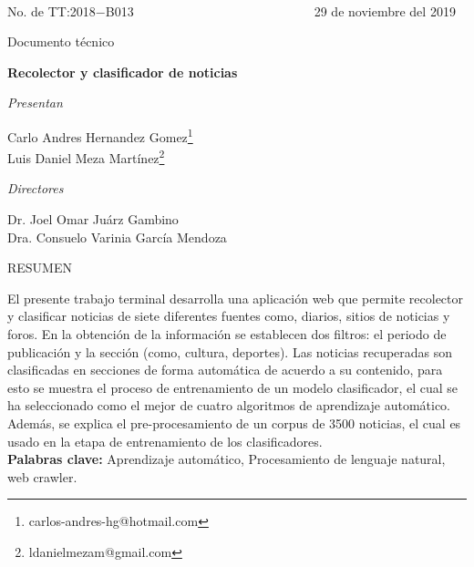 \ \\[1cm]
No. de TT:2018$-$B013  
$\ \ \ \ \ \ \ \ \ \ \ \ \ \ \ \ \ \ \ \ \ \ \ \ \ \ \ \ \ \ \ \ \ \ \ \ \ \ \ \ \ \ \ \ \ \ \ \ \ \ \ \ \ \ \ \ \ \ \ \ \ $
29 de noviembre del 2019

\begin{center}

  \begin{large}
    Documento técnico\\[1cm]
  \end{large}

  \textbf{ \LARGE{R}\LARGE{ecolector} \LARGE{y} \LARGE{clasificador} \LARGE{de}  
  \LARGE{noticias}}\\[1cm]

  \begin{large}
    \textit{Presentan}\\[0.5cm]
  \end{large}

  \large{Carlo Andres Hernandez Gomez}\footnote{carlos-andres-hg@hotmail.com}\\
  \large{Luis Daniel Meza Martínez}\footnote{ldanielmezam@gmail.com}\\[0.5cm]

  \begin{large}
    \textit{Directores}\\[0.5cm]
  \end{large}

  \large{Dr. Joel Omar Juárz Gambino }\\
  \large{Dra. Consuelo Varinia García Mendoza }\\[0.5cm]

  \begin{large}
   RESUMEN\\[0.5cm]
  \end{large}


\end{center}

El presente trabajo terminal desarrolla una aplicación web que permite recolector y clasificar noticias de siete diferentes fuentes como, diarios, sitios de noticias y foros. En la obtención de la información se establecen dos filtros: el periodo de publicación y la sección (como, cultura, deportes). Las noticias recuperadas son clasificadas en secciones de forma automática de acuerdo a su contenido, para esto se muestra el proceso de entrenamiento de un modelo clasificador, el cual se ha seleccionado como el mejor de cuatro algoritmos de aprendizaje automático. Además, se explica el pre-procesamiento de un corpus de 3500 noticias, el cual es usado en la etapa de entrenamiento de los clasificadores.\\

\textbf{Palabras clave:} Aprendizaje automático, Procesamiento de lenguaje natural, web crawler.
